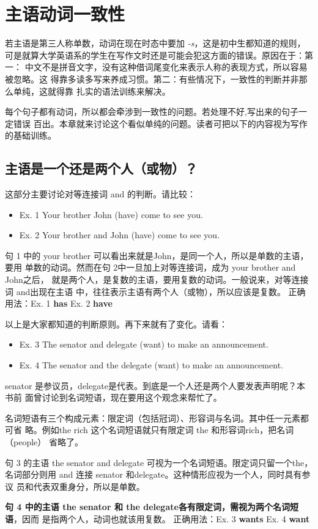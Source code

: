 \chapter{主语动词一致性}

若主语是第三人称单数，动词在现在时态中要加 \emph{-s}，这是初中生都知道的规则，
可是就算大学英语系的学生在写作文时还是可能会犯这方面的错误。原因在于：第一：
中文不是拼音文字，没有这种借词尾变化来表示人称的表现方式，所以容易被忽略。这
得靠多读多写来养成习惯。第二：有些情况下，一致性的判断并非那么单纯，这就得靠
扎实的语法训练来解决。

每个句子都有动词，所以都会牵涉到一致性的问题。若处理不好,写出来的句子一定错误
百出。本章就来讨论这个看似单纯的问题。读者可把以下的内容视为写作的基础训练。

\section{主语是一个还是两个人（或物）？}

这部分主要讨论对等连接词 and 的判断。请比较：
\begin{mybox}
  \begin{itemize}
  \item   Ex. 1 Your brother John (have) come to see you.
  \item   Ex. 2 Your brother and John (have) come to see you.
  \end{itemize}
  句 1 中的 your brother 可以看出来就是John，是同一个人，所以是单数的主语，要用
  单数的动词。然而在句 2中一旦加上对等连接词，成为 your brother and John之后，
  就是两个人，是复数的主语，要用复数的动词。一般说来，对等连接词 and出现在主语
  中，往往表示主语有两个人（或物），所以应该是复数。
  \tcblower
  正确用法：Ex. 1 \textbf{has} \qquad\qquad Ex. 2 \textbf{have}
\end{mybox}

以上是大家都知道的判断原则。再下来就有了变化。请看：

\begin{mybox}

  \begin{itemize}
  \item   Ex. 3 The senator and delegate (want) to make an announcement.
  \item   Ex. 4 The senator and the delegate (want) to make an announcement.
  \end{itemize}
  senator 是参议员，delegate是代表。到底是一个人还是两个人要发表声明呢？本书前
  面曾讨论到名词短语，现在要用这个观念来帮忙了。

  名词短语有三个构成元素：限定词（包括冠词）、形容词与名词。其中任一元素都可省
  略。例如the rich 这个名词短语就只有限定词 the 和形容词rich，把名词（people）
  省略了。

  句 3 的主语 the senator and delegate 可视为一个名词短语。限定词只留一个the，
  名词部分则用 and 连接 senator 和delegate。这种情形应视为一个人，同时具有参议
  员和代表双重身分，所以是单数。

  \textbf{句 4 中的主语 the senator 和 the delegate各有限定词，需视为两个名词短语}，因而
  是指两个人，动词也就该用复数。
  \tcblower
  正确用法：Ex. 3 \textbf{wants} \qquad\quad Ex. 4 \textbf{want}
\end{mybox}

